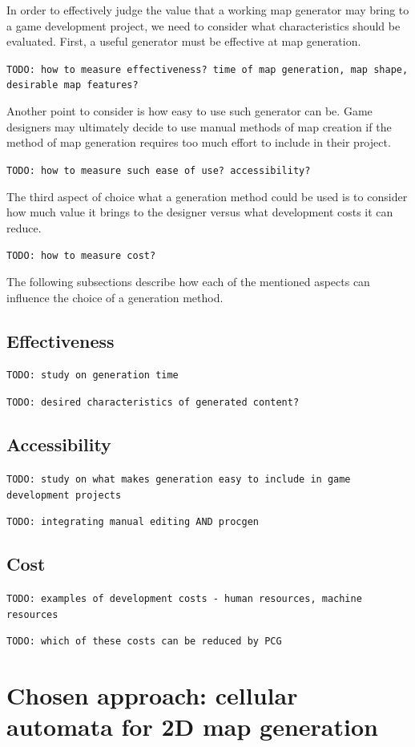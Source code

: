 \documentclass[12pt]{report}
\newcommand{\todo}[1]{}
\renewcommand{\todo}[1]{{\color{red} \par \noindent \footnotesize \texttt{TODO: {#1} }}}
\begin{document}
In order to effectively judge the value that a working map generator may bring to a game development project, we need to consider what characteristics should be evaluated. First, a useful generator must be effective at map generation.

\todo{how to measure effectiveness? time of map generation, map shape, desirable map features?}

Another point to consider is how easy to use such generator can be. Game designers may ultimately decide to use manual methods of map creation if the method of map generation requires too much effort to include in their project.

\todo{how to measure such ease of use? accessibility? }

The third aspect of choice what a generation method could be used is to consider how much value it brings to the designer versus what development costs it can reduce.

\todo{how to measure cost?}

The following subsections describe how each of the mentioned aspects can influence the choice of a generation method.

\subsection{Effectiveness} 
\todo{study on generation time}
\todo{desired characteristics of generated content?}

\subsection{Accessibility} 

\todo{study on what makes generation easy to include in game development projects}
\todo{integrating manual editing AND procgen}

\subsection{Cost} 
\todo{examples of development costs - human resources, machine resources}
\todo{which of these costs can be reduced by PCG}




\section{Chosen approach: cellular automata for 2D map generation}
\end{document}
